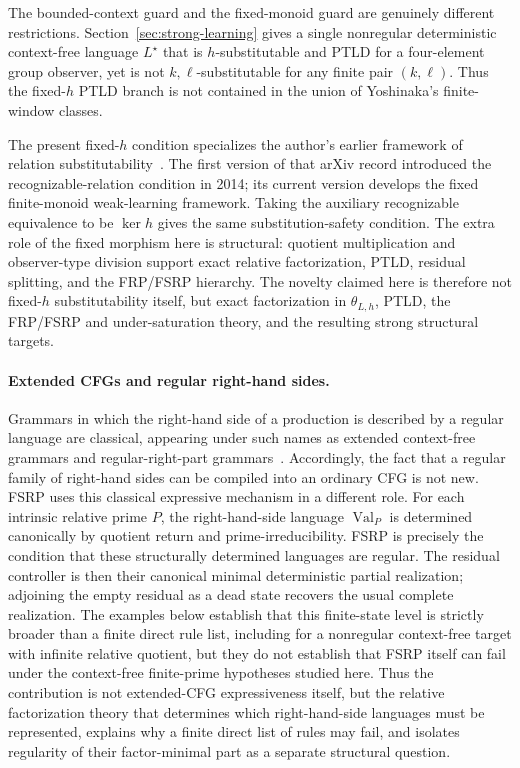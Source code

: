 \documentclass[11pt,a4paper]{article}
\newcommand{\Val}{\operatorname{Val}}
\begin{document}
The bounded-context guard and the fixed-monoid guard are genuinely different restrictions.  Section~\ref{sec:strong-learning} gives a single nonregular deterministic context-free language $L^\star$ that is $h$-substitutable and PTLD for a four-element group observer, yet is not $k,\ell$-substitutable for any finite pair $(k,\ell)$.  Thus the fixed-$h$ PTLD branch is not contained in the union of Yoshinaka's finite-window classes.

The present fixed-$h$ condition specializes the author's earlier framework of relation substitutability~\cite{KuriyamaFixedH}.  The first version of that arXiv record introduced the recognizable-relation condition in 2014; its current version develops the fixed finite-monoid weak-learning framework.  Taking the auxiliary recognizable equivalence to be $\ker h$ gives the same substitution-safety condition.  The extra role of the fixed morphism here is structural: quotient multiplication and observer-type division support exact relative factorization, PTLD, residual splitting, and the FRP/FSRP hierarchy.  The novelty claimed here is therefore not fixed-$h$ substitutability itself, but exact factorization in $\theta_{L,h}$, PTLD, the FRP/FSRP and under-saturation theory, and the resulting strong structural targets.


\paragraph{Extended CFGs and regular right-hand sides.}
Grammars in which the right-hand side of a production is described by a regular language are classical, appearing under such names as extended context-free grammars and regular-right-part grammars~\cite{MadsenKristensen1976,LaLonde1977,LaLonde1979}.  Accordingly, the fact that a regular family of right-hand sides can be compiled into an ordinary CFG is not new.  FSRP uses this classical expressive mechanism in a different role.  For each intrinsic relative prime $P$, the right-hand-side language $\Val_P$ is determined canonically by quotient return and prime-irreducibility.  FSRP is precisely the condition that these structurally determined languages are regular.  The residual controller is then their canonical minimal deterministic partial realization; adjoining the empty residual as a dead state recovers the usual complete realization.  The examples below establish that this finite-state level is strictly broader than a finite direct rule list, including for a nonregular context-free target with infinite relative quotient, but they do not establish that FSRP itself can fail under the context-free finite-prime hypotheses studied here.  Thus the contribution is not extended-CFG expressiveness itself, but the relative factorization theory that determines which right-hand-side languages must be represented, explains why a finite direct list of rules may fail, and isolates regularity of their factor-minimal part as a separate structural question.
\end{document}
